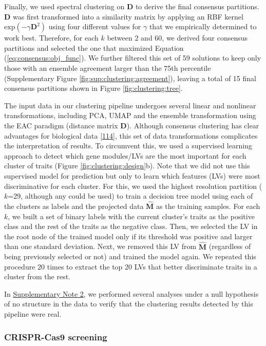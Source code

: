 \documentclass[
  legalpaperpaper,
]{article}
\begin{document}
Finally, we used spectral clustering on \(\mathbf{D}\) to derive the final consensus partitions.
\(\mathbf{D}\) was first transformed into a similarity matrix by applying an RBF kernel \(\mathrm{exp}(-\gamma \mathbf{D}^2)\) using four different values for \(\gamma\) that we empirically determined to work best.
Therefore, for each \(k\) between 2 and 60, we derived four consensus partitions and selected the one that maximized Equation (\ref{eq:consensus:obj_func}).
We further filtered this set of 59 solutions to keep only those with an ensemble agreement larger than the 75th percentile (Supplementary Figure \ref{fig:sup:clustering:agreement}), leaving a total of 15 final consensus partitions shown in Figure \ref{fig:clustering:tree}.

The input data in our clustering pipeline undergoes several linear and nonlinear transformations, including PCA, UMAP and the ensemble transformation using the EAC paradigm (distance matrix \(\mathbf{D}\)).
Although consensus clustering has clear advantages for biological data {[}\protect\hyperlink{ref-S7LBsfcF}{114}{]}, this set of data transformations complicates the interpretation of results.
To circumvent this, we used a supervised learning approach to detect which gene modules/LVs are the most important for each cluster of traits (Figure \ref{fig:clustering:design}b).
Note that we did not use this supervised model for prediction but only to learn which features (LVs) were most discriminative for each cluster.
For this, we used the highest resolution partition (\(k\)=29, although any could be used) to train a decision tree model using each of the clusters as labels and the projected data \(\hat{\mathbf{M}}\) as the training samples.
For each \(k\), we built a set of binary labels with the current cluster's traits as the positive class and the rest of the traits as the negative class.
Then, we selected the LV in the root node of the trained model only if its threshold was positive and larger than one standard deviation.
Next, we removed this LV from \(\hat{\mathbf{M}}\) (regardless of being previously selected or not) and trained the model again.
We repeated this procedure 20 times to extract the top 20 LVs that better discriminate traits in a cluster from the rest.

In \protect\hyperlink{sm:clustering:null_sim}{Supplementary Note 2}, we performed several analyses under a null hypothesis of no structure in the data to verify that the clustering results detected by this pipeline were real.

\hypertarget{sec:methods:crispr}{%
\subsubsection{CRISPR-Cas9 screening}\label{sec:methods:crispr}}
\end{document}
